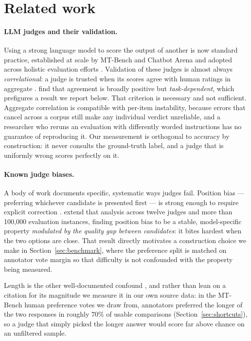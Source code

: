 \section{Related work}
\label{sec:related}

\paragraph{LLM judges and their validation.}
Using a strong language model to score the output of another is now standard
practice, established at scale by MT-Bench and Chatbot Arena
\citep{zheng2023judging} and adopted across holistic evaluation efforts
\citep{liang2023holistic}. Validation of these judges is almost always
\emph{correlational}: a judge is trusted when its scores agree with human ratings
in aggregate \citep{chiang2023can, liu2023geval}. \citet{chiang2023can} find that
agreement is broadly positive but \emph{task-dependent}, which prefigures a result we
report below. That criterion is necessary and not sufficient. Aggregate
correlation is compatible with per-item instability, because errors that cancel
across a corpus still make any individual verdict unreliable, and a researcher who
reruns an evaluation with differently worded instructions has no guarantee of
reproducing it. Our measurement is orthogonal to accuracy by construction: it
never consults the ground-truth label, and a judge that is uniformly wrong scores
perfectly on it.

\paragraph{Known judge biases.}
A body of work documents specific, systematic ways judges fail. Position bias ---
preferring whichever candidate is presented first --- is strong enough to require
explicit correction \citep{wang2023fair}. \citet{shi2024judging} extend that
analysis across twelve judges and more than 100{,}000 evaluation instances,
finding position bias to be a stable, model-specific property \emph{modulated by
the quality gap between candidates}: it bites hardest when the two options are
close. That result directly motivates a construction choice we make in
Section~\ref{sec:benchmark}, where the preference split is matched on annotator
vote margin so that difficulty is not confounded with the property being measured.

Length is the other well-documented confound \citep{wang2023fair}, and rather
than lean on a citation for its magnitude we measure it in our own source data:
in the MT-Bench human preference votes we draw from, annotators preferred the
longer of the two responses in roughly 70\% of usable comparisons
(Section~\ref{sec:shortcuts}), so a judge that simply picked the longer answer
would score far above chance on an unfiltered sample.

